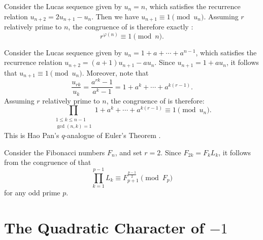 \begin{example}
  Consider the Lucas sequence given by $u_n=n$, which satisfies the recurrence relation $u_{n+2}=2u_{n+1}-u_n$. Then we have $u_{n+1}\equiv 1\pmod{u_n}$. Assuming $r$ relatively prime to $n$, the congruence of  is therefore exactly :
  \begin{equation*}
    r^{\varphi(n)} \equiv 1 \pmod{n}.
  \end{equation*}
\end{example}

\begin{example}
  Consider the Lucas sequence given by $u_n=1+a+\cdots+a^{n-1}$, which satisfies the recurrence relation $u_{n+2}=(a+1)u_{n+1}-au_n$. Since $u_{n+1}=1+au_n$, it follows that $u_{n+1}\equiv 1\pmod{u_n}$. Moreover, note that
  \begin{equation*}
    \frac{u_{rk}}{u_k} = \frac{a^{rk}-1}{a^k-1}=1+a^k+\cdots+a^{k(r-1)}.
  \end{equation*}
  Assuming $r$ relatively prime to $n$, the congruence of  is therefore:
  \begin{equation*}
    \prod_{\substack{1\leq k \leq n-1\\ \gcd(n,k)=1}} 1+a^k+\cdots+a^{k(r-1)} \equiv 1 \pmod{u_n}.
  \end{equation*}
  This is Hao Pan's $q$-analogue of Euler's Theorem \cite{pan2007}.
\end{example}

\begin{example}
  Consider the Fibonacci numbers $F_n$, and set $r=2$. Since $F_{2k}=F_k L_k$, it follows from the congruence of  that
  \begin{equation*}
    \prod_{k=1}^{p-1} L_k \equiv F_{p+1}^{\frac{p-1}{2}} \pmod{F_p}
  \end{equation*}
  for any odd prime $p$.
\end{example}

\section{The Quadratic Character of \texorpdfstring{$-1$}{-1}}

